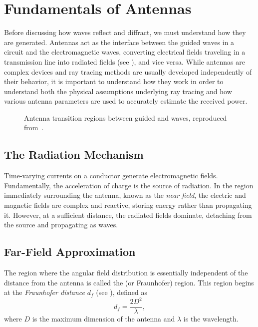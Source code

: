 \section{Fundamentals of Antennas}

Before discussing how waves reflect and diffract, we must understand how they are generated. Antennas act as the interface between the guided waves in a circuit and the  electromagnetic waves, converting electrical fields traveling in a transmission line into radiated fields (see ), and vice versa. While antennas are complex devices and ray tracing methods are usually developed independently of their behavior, it is important to understand how they work in order to understand both the physical assumptions underlying ray tracing and how various antenna parameters are used to accurately estimate the received power.

\begin{figure}
  \centering
  \caption{Antenna transition regions between guided and  waves, reproduced from~\cite[Fig.~4.1]{Saunders2024}.}
\end{figure}

\subsection{The Radiation Mechanism}

Time-varying currents on a conductor generate electromagnetic fields. Fundamentally, the acceleration of charge is the source of radiation. In the region immediately surrounding the antenna, known as the \emph{\gls{near field}}, the electric and magnetic fields are complex and reactive, storing energy rather than propagating it. However, at a sufficient distance, the radiated fields dominate, detaching from the source and propagating as waves.

\subsection{Far-Field Approximation}

\begin{marginfigure}
  \centering
  \caption{Field regions of an antenna, adapted from~\cite[Fig.~4.3]{Saunders2024}.}
\end{marginfigure}

The region where the angular field distribution is essentially independent of the distance from the antenna is called the \emph{} (or Fraunhofer) region. This region begins at the \emph{Fraunhofer distance} $d_f$ (see ), defined as
\begin{equation}
  d_f = \frac{2D^2}{\lambda},
\end{equation}
where $D$ is the maximum dimension of the antenna and $\lambda$ is the \gls{wavelength}.

